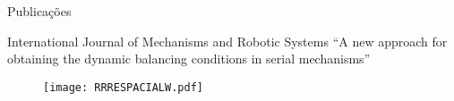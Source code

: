 \documentclass[25pt,landscape]{beamer}
\begin{document}
\begin{frame}{Publica\c{c}\~oes}
    \begin{block}{International Journal of Mechanisms and Robotic Systems}
        ``A new approach for obtaining the dynamic balancing conditions in serial mechanisms''
    \end{block}
    \begin{figure}[!h]
        \centering
        \texttt{[image: RRRESPACIALW.pdf]}
    \end{figure}
\end{frame}


\end{document}
